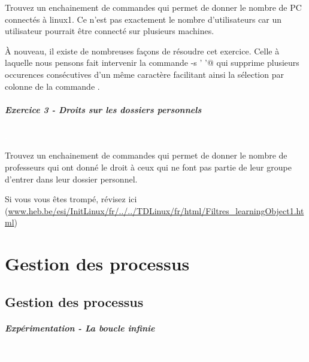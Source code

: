\documentclass[11pt,a4paper]{article}
\begin{document}
            \par
        
					Trouvez un enchainement de commandes
					qui permet de donner le nombre de PC
					connect\'es \`a linux1.
					Ce n'est pas exactement le nombre d'utilisateurs
					car un utilisateur pourrait \^etre connect\'e
					sur plusieurs machines.
				
            \par
        
					\`A nouveau,
					il existe de nombreuses fa\c cons de r\'esoudre
					cet exercice. 
					Celle \`a laquelle nous pensons fait intervenir
					la commande 
					\verb@tr -s ' '@
					qui supprime plusieurs occurences
					cons\'ecutives d'un m\^eme caract\`ere
					facilitant ainsi la s\'election par colonne
					de la commande 
					\verb@cut@.
				
            \par
        
			
		\subparagraph{Exercice 3 - Droits sur les dossiers personnels} 
		
					\textcolor{white}{.} \par
				
            \par
        
					Trouvez un enchainement de commandes
					qui permet de donner 
					le nombre de professeurs
					qui ont donn\'e le droit \`a ceux qui
					ne font pas partie de leur groupe
					d'entrer dans leur dossier personnel.
				
            \par
         Si vous vous \^etes tromp\'e, r\'evisez ici (\url{www.heb.be/esi/InitLinux/fr/../../TDLinux/fr/html/Filtres\_learningObject1.html})
            \par
        \section{Gestion des processus}\subsection{Gestion des processus}
			
		\subparagraph{Exp\'erimentation - La boucle infinie} 
		
					\textcolor{white}{.} \par
				
            \par
        
\end{document}
